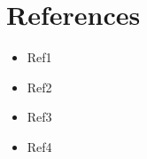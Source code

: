 \section{References}

\begin{singlespace}
	
\begin{itemize}[noitemsep]
  \item Ref1

  \item Ref2
  
  \item Ref3

  \item Ref4
  

\end{itemize}

\end{singlespace}

